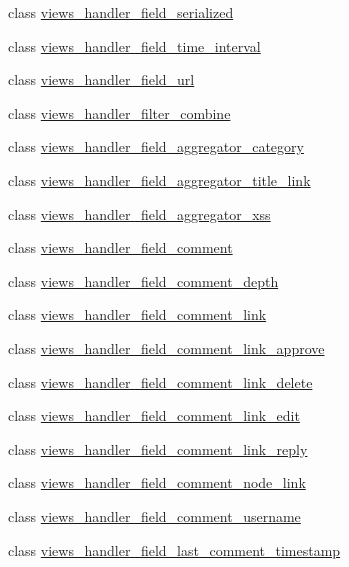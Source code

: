 \begin{DoxyCompactItemize}
\item 
class \hyperlink{classviews__handler__field__serialized}{views\_\-handler\_\-field\_\-serialized}
\item 
class \hyperlink{classviews__handler__field__time__interval}{views\_\-handler\_\-field\_\-time\_\-interval}
\item 
class \hyperlink{classviews__handler__field__url}{views\_\-handler\_\-field\_\-url}
\item 
class \hyperlink{classviews__handler__filter__combine}{views\_\-handler\_\-filter\_\-combine}
\item 
class \hyperlink{classviews__handler__field__aggregator__category}{views\_\-handler\_\-field\_\-aggregator\_\-category}
\item 
class \hyperlink{classviews__handler__field__aggregator__title__link}{views\_\-handler\_\-field\_\-aggregator\_\-title\_\-link}
\item 
class \hyperlink{classviews__handler__field__aggregator__xss}{views\_\-handler\_\-field\_\-aggregator\_\-xss}
\item 
class \hyperlink{classviews__handler__field__comment}{views\_\-handler\_\-field\_\-comment}
\item 
class \hyperlink{classviews__handler__field__comment__depth}{views\_\-handler\_\-field\_\-comment\_\-depth}
\item 
class \hyperlink{classviews__handler__field__comment__link}{views\_\-handler\_\-field\_\-comment\_\-link}
\item 
class \hyperlink{classviews__handler__field__comment__link__approve}{views\_\-handler\_\-field\_\-comment\_\-link\_\-approve}
\item 
class \hyperlink{classviews__handler__field__comment__link__delete}{views\_\-handler\_\-field\_\-comment\_\-link\_\-delete}
\item 
class \hyperlink{classviews__handler__field__comment__link__edit}{views\_\-handler\_\-field\_\-comment\_\-link\_\-edit}
\item 
class \hyperlink{classviews__handler__field__comment__link__reply}{views\_\-handler\_\-field\_\-comment\_\-link\_\-reply}
\item 
class \hyperlink{classviews__handler__field__comment__node__link}{views\_\-handler\_\-field\_\-comment\_\-node\_\-link}
\item 
class \hyperlink{classviews__handler__field__comment__username}{views\_\-handler\_\-field\_\-comment\_\-username}
\item 
class \hyperlink{classviews__handler__field__last__comment__timestamp}{views\_\-handler\_\-field\_\-last\_\-comment\_\-timestamp}

\end{DoxyCompactItemize}
